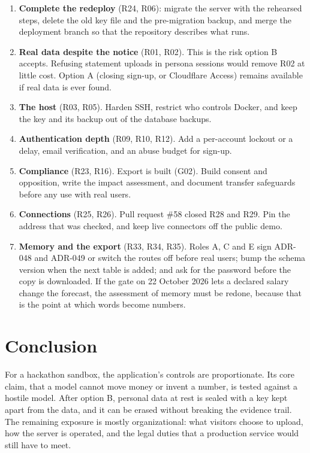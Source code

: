 \documentclass[11pt,a4paper]{article}
\begin{document}
\begin{enumerate}
  \item \textbf{Complete the redeploy} (R24, R06): migrate the server with the rehearsed steps, delete the old key file
    and the pre-migration backup, and merge the deployment branch so that the repository describes what runs.
  \item \textbf{Real data despite the notice} (R01, R02). This is the risk option B accepts. Refusing statement uploads in
    persona sessions would remove R02 at little cost. Option A (closing sign-up, or Cloudflare Access) remains available
    if real data is ever found.
  \item \textbf{The host} (R03, R05). Harden SSH, restrict who controls Docker, and keep the key and its backup out of the
    database backups.
  \item \textbf{Authentication depth} (R09, R10, R12). Add a per-account lockout or a delay, email verification, and an
    abuse budget for sign-up.
  \item \textbf{Compliance} (R23, R16). Export is built (G02). Build consent and opposition, write the impact
    assessment, and document transfer safeguards before any use with real users.
  \item \textbf{Connections} (R25, R26). Pull request \#58 closed R28 and R29. Pin the address that was checked, and
    keep live connectors off the public demo.
  \item \textbf{Memory and the export} (R33, R34, R35). Roles A, C and E sign ADR-048 and ADR-049 or switch the routes
    off before real users; bump the schema version when the next table is added; and ask for the password before the
    copy is downloaded. If the gate on 22 October 2026 lets a declared salary change the forecast, the assessment of
    memory must be redone, because that is the point at which words become numbers.
\end{enumerate}

\section{Conclusion}

For a hackathon sandbox, the application's controls are proportionate. Its core claim, that a model cannot move money
or invent a number, is tested against a hostile model. After option B, personal data at rest is sealed with a key kept
apart from the data, and it can be erased without breaking the evidence trail. The remaining exposure is mostly
organizational: what visitors choose to upload, how the server is operated, and the legal duties that a production
service would still have to meet.
\end{document}
